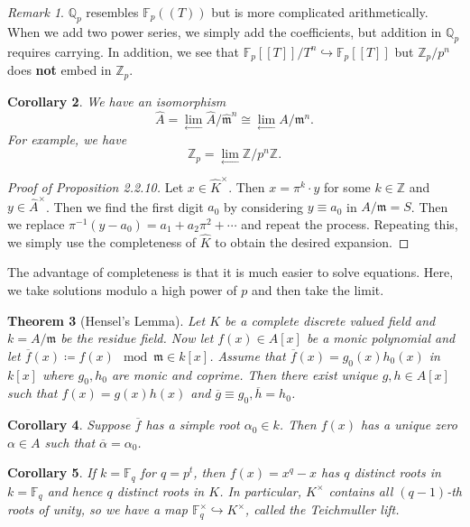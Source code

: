 \documentclass[leqno, openany]{memoir}
\newtheorem{thm}{Theorem}[section]
\newtheorem{cor}[thm]{Corollary}
\theoremstyle{definition}
\theoremstyle{remark}
\newtheorem{rmk}[thm]{Remark}
\theoremstyle{plain}
\theoremstyle{definition}
\theoremstyle{remark}
\newcommand{\F}{\mathbb{F}}
\newcommand{\Z}{\mathbb{Z}}
\newcommand{\Q}{\mathbb{Q}}
\newcommand{\mf}[1]{\mathfrak{#1}}
\newcommand{\ol}[1]{\overline{#1}}
\newcommand{\wh}[1]{\widehat{#1}}
\begin{document}
\begin{rmk} $\Q_p$ resembles $\F_p((T))$ but is more complicated
    arithmetically. When we add two power series, we simply add the
    coefficients, but addition in $\Q_p$ requires carrying. In addition, we see
    that $\F_p [[T]] / T^n \hookrightarrow \F_p[[T]]$ but $\Z_p / p^n$ does
    \textbf{not} embed in $\Z_p$.  \end{rmk}

\begin{cor} We have an isomorphism \[ \wh{A} = \lim_{\longleftarrow} \wh{A} /
    \wh{\mf{m}}^n \cong \lim_{\longleftarrow} A/\mf{m}^n. \] For example, we
    have \[ \Z_p = \lim_{\longleftarrow} \Z/p^n \Z. \] \end{cor}

\begin{proof}[Proof of Proposition 2.2.10] Let $x \in \wh{K}^{\times}$. Then $x
    = \pi^k \cdot y$ for some $k \in \Z$ and $y \in \wh{A}^{\times}$. Then we
    find the first digit $a_0$ by considering $y \equiv a_0$ in $A/\mf{m} = S$.
    Then we replace $\pi^{-1} (y-a_0) = a_1 + a_2 \pi^2 + \cdots$ and repeat
    the process. Repeating this, we simply use the completeness of $\wh{K}$ to
    obtain the desired expansion.  \end{proof}

The advantage of completeness is that it is much easier to solve equations.
Here, we take solutions modulo a high power of $p$ and then take the limit.

\begin{thm}[Hensel's Lemma] Let $K$ be a complete discrete valued field and $k
    = A/\mf{m}$ be the residue field. Now let $f(x) \in A[x]$ be a monic
    polynomial and let $\ol{f}(x) \coloneqq f(x) \mod \mf{m} \in k[x]$. Assume
    that $\ol{f}(x) = g_0(x) h_0(x)$ in $k[x]$ where $g_0, h_0$ are monic and
    coprime. Then there exist unique $g,h \in A[x]$ such that $f(x) = g(x)
    h(x)$ and $\ol{g} \equiv g_0, \ol{h} = h_0$.  \end{thm}

\begin{cor} Suppose $\ol{f}$ has a simple root $\alpha_0 \in k$. Then $f(x)$
has a unique zero $\alpha \in A$ such that $\ol{\alpha} = \alpha_0$.  \end{cor}

\begin{cor} If $k = \F_q$ for $q = p^t$, then $f(x) = x^q - x$ has $q$ distinct
    roots in $k = \F_q$ and hence $q$ distinct roots in $K$. In particular,
    $K^{\times}$ contains all $(q-1)$-th roots of unity, so we have a map
    $\F_q^{\times }\hookrightarrow K^{\times}$, called the \textit{Teichmuller
    lift}.  \end{cor}
\end{document}
